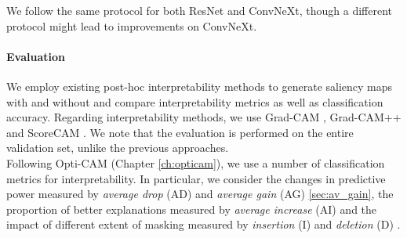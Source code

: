 We follow the same protocol for both ResNet and ConvNeXt, though a different protocol might lead to 
improvements on ConvNeXt.


\paragraph{Evaluation}
We employ existing post-hoc interpretability methods to generate saliency maps with and without 
\Ours and compare interpretability metrics as well as classification accuracy. Regarding 
interpretability methods, we use Grad-CAM \autocite{selvaraju2017grad}, 
Grad-CAM++ \autocite{chattopadhay2018grad} and ScoreCAM \autocite{wang2020score}. We note that the 
evaluation is performed on the entire validation set, unlike the previous approaches.\\

\noindent Following Opti-CAM (Chapter \ref{ch:opticam}), we use a number of classification metrics 
for interpretability. In particular, we consider the changes in predictive power measured by 
\emph{average drop} (AD) \autocite{chattopadhay2018grad} and \emph{average gain} (AG) 
\autoref{sec:av_gain}, the proportion of better explanations measured by \emph{average increase} (AI) 
\autocite{chattopadhay2018grad} and the impact of different extent of masking measured by 
\emph{insertion} (I) and \emph{deletion} (D) \autocite{petsiuk2018rise}.




